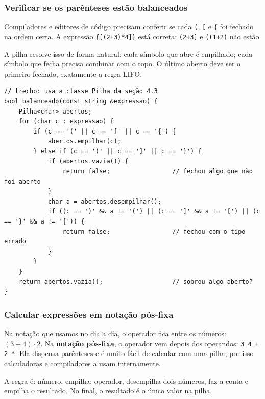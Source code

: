 \subsubsection{Verificar se os parênteses estão balanceados}

Compiladores e editores de código precisam conferir se cada \texttt{(}, \texttt{[} e \texttt{\{} foi fechado na ordem certa. A expressão \texttt{\{[(2+3)*4]\}} está correta; \texttt{(2+3]} e \texttt{((1+2)} não estão.

A pilha resolve isso de forma natural: cada símbolo que abre é empilhado; cada símbolo que fecha precisa combinar com o topo. O último aberto deve ser o primeiro fechado, exatamente a regra LIFO.

\begin{codigo}
\begin{Verbatim}[breaklines=true, breaksymbolleft={}, fontsize=\footnotesize]
// trecho: usa a classe Pilha da seção 4.3
bool balanceado(const string &expressao) {
    Pilha<char> abertos;
    for (char c : expressao) {
        if (c == '(' || c == '[' || c == '{') {
            abertos.empilhar(c);
        } else if (c == ')' || c == ']' || c == '}') {
            if (abertos.vazia()) {
                return false;                 // fechou algo que não foi aberto
            }
            char a = abertos.desempilhar();
            if ((c == ')' && a != '(') || (c == ']' && a != '[') || (c == '}' && a != '{')) {
                return false;                 // fechou com o tipo errado
            }
        }
    }
    return abertos.vazia();                   // sobrou algo aberto?
}
\end{Verbatim}
\end{codigo}

\subsubsection{Calcular expressões em notação pós-fixa}

Na notação que usamos no dia a dia, o operador fica entre os números: $(3 + 4) \cdot 2$. Na \textbf{notação pós-fixa}, o operador vem depois dos operandos: \texttt{3 4 + 2 *}. Ela dispensa parênteses e é muito fácil de calcular com uma pilha, por isso calculadoras e compiladores a usam internamente.

A regra é: número, empilha; operador, desempilha dois números, faz a conta e empilha o resultado. No final, o resultado é o único valor na pilha.

